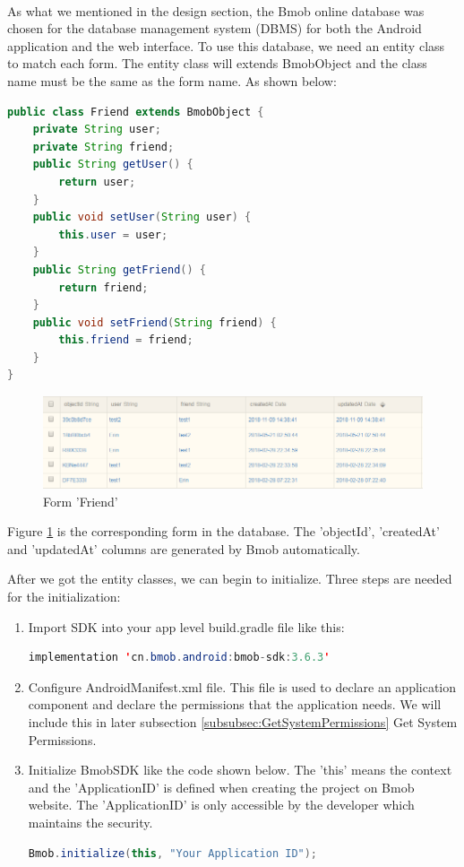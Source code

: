 \paragraph{}As what we mentioned in the design section, the Bmob online database was chosen for the database management system (DBMS) for both the Android application and the web interface. To use this database, we need an entity class to match each form. The entity class will extends BmobObject and the class name must be the same as the form name. As shown below:
\begin{lstlisting}[language=JAVA] 
public class Friend extends BmobObject {
    private String user;
    private String friend;
    public String getUser() {
        return user;
    }
    public void setUser(String user) {
        this.user = user;
    }
    public String getFriend() {
        return friend;
    }
    public void setFriend(String friend) {
        this.friend = friend;
    }
}
\end{lstlisting} 
\begin{figure}[htb]
\centering
\includegraphics[width=.9\textwidth]{section04/assets/databaseOverview.png}
\caption[Short Caption]{\label{DatabseOverview}Form 'Friend'}
\end{figure}
\par Figure \ref{DatabseOverview} is the corresponding form in the database. The 'objectId', 'createdAt' and 'updatedAt' columns are generated by Bmob automatically. 
\par After we got the entity classes, we can begin to initialize. Three steps are needed for the initialization: 
\begin{enumerate}
\item[1)]Import SDK into your app level build.gradle file like this:
\begin{lstlisting}[language=JAVA] 
implementation 'cn.bmob.android:bmob-sdk:3.6.3'
\end{lstlisting} 
\item[2)] Configure AndroidManifest.xml file. This file is used to declare an application component and declare the permissions that the application needs. We will include this in later subsection \ref{subsubsec:GetSystemPermissions} Get System Permissions.
\item[3)] Initialize BmobSDK like the code shown below. The 'this' means the context and the 'ApplicationID' is defined when creating the project on Bmob website. The 'ApplicationID' is only accessible by the developer which maintains the security.
\begin{lstlisting}[language=JAVA] 
Bmob.initialize(this, "Your Application ID");
\end{lstlisting} 
\end{enumerate}
